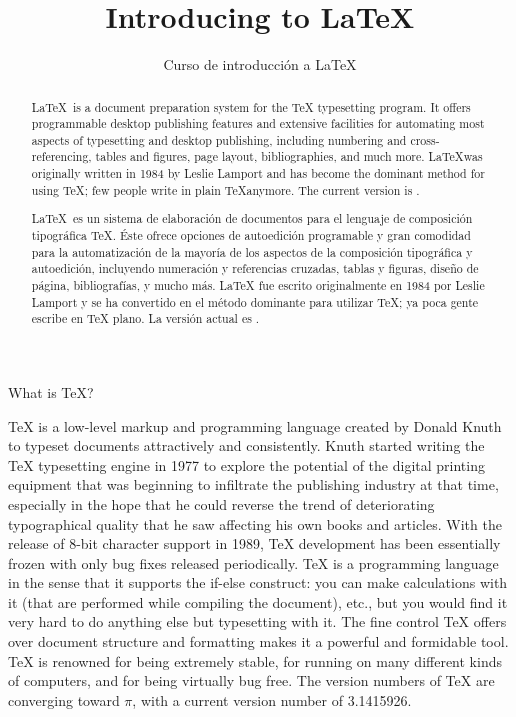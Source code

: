 \documentclass[10pt,letterpaper]{article}
\title{Introducing to \LaTeX}
\author{Curso de introducción a LaTeX}
\begin{document}
\maketitle  
\begin{abstract}
\LaTeX\ is a document preparation system for the \TeX
typesetting program. It offers programmable desktop publishing features and extensive facilities for automating most aspects of
typesetting and desktop publishing, including numbering and
cross-referencing, tables and figures, page layout, bibliographies,
and much more. \LaTeX was originally written in 1984 by Leslie
Lamport and has become the dominant method for using \TeX; few
people write in plain \TeX anymore. The current version is
\LaTeXe.
\end{abstract}
\renewcommand{\abstractname}{Resumen} %
\begin{abstract}
\LaTeX\ es un sistema de elaboración de documentos para el lenguaje de composición tipográfica \TeX{}. Éste ofrece opciones de autoedición programable y gran comodidad para la automatización de la mayoría de los aspectos de la composición tipográfica y autoedición, incluyendo numeración y referencias cruzadas, tablas y figuras, diseño de página, bibliografías, y mucho más. \LaTeX{} fue escrito originalmente en 1984 por Leslie
Lamport y se ha convertido en el método dominante para utilizar \TeX{}; ya poca gente escribe en \TeX{} plano. La versión actual es \LaTeXe{}.
\end{abstract}

What is TeX?

TeX is a low-level markup and programming language created by Donald Knuth to typeset documents attractively and consistently. Knuth started writing the TeX typesetting engine in 1977 to explore the potential of the digital printing equipment that was beginning to infiltrate the publishing industry at that time, especially in the hope that he could reverse the trend of deteriorating typographical quality that he saw affecting his own books and articles. With the release of 8-bit character support in 1989, TeX development has been essentially frozen with only bug fixes released periodically. TeX is a programming language in the sense that it supports the if-else construct: you can make calculations with it (that are performed while compiling the document), etc., but you would find it very hard to do anything else but typesetting with it. The fine control TeX offers over document structure and formatting makes it a powerful and formidable tool. TeX is renowned for being extremely stable, for running on many different kinds of computers, and for being virtually bug free. The version numbers of TeX are converging toward $\pi$, with a current version number of 3.1415926.
\end{document}
